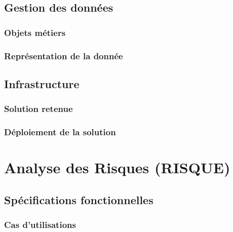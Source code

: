 
\subsection{Gestion des données}

\subsubsection{Objets métiers}


\subsubsection{Représentation de la donnée}


\subsection{Infrastructure}

\subsubsection{Solution retenue}


\subsubsection{Déploiement de la solution}


\section{Analyse des Risques (RISQUE)}%

\subsection{Spécifications fonctionnelles}

\subsubsection{Cas d’utilisations}

